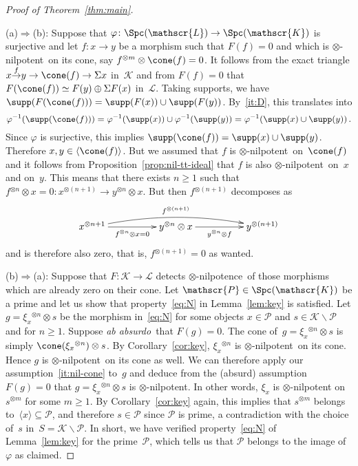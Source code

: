 \documentclass{amsart}
\numberwithin{equation}{section}
\theoremstyle{remark}
\begin{document}
\begin{proof}[Proof of Theorem~\ref{thm:main}]
\

(a)${\Rightarrow}$(b): Suppose that $\varphi\colon{\Spc({\mathscr{L}})}\to {\Spc({\mathscr{K}})}$ is surjective and let $f\colon x\to y$ be a morphism such that $F(f)=0$ and which is {$\otimes$-nilpotent}\ on its cone, say $f{^{\otimes {m}}}\otimes\cone(f)=0$. It follows from the exact triangle $x{\overset{{f}}\to} y\to \cone(f)\to \Sigma x$ in~${\mathscr{{K}}}$ and from $F(f)=0$ that $F(\cone(f))\simeq F(y)\oplus \Sigma F(x)$ in~${\mathscr{{L}}}$. Taking supports, we have $\supp(F(\cone(f)))=\supp(F(x))\cup \supp(F(y))$. By~\eqref{it:D}, this translates into
\[
\varphi{^{-1}}(\supp(\cone(f)))=\varphi{^{-1}}(\supp(x))\cup \varphi{^{-1}}(\supp(y))=\varphi{^{-1}}(\supp(x)\cup \supp(y))\,.
\]
Since $\varphi$ is surjective, this implies $\supp(\cone(f))=\supp(x)\cup \supp(y)$. Therefore $x,y\in{\langle {\cone(f)}\rangle}$. But we assumed that $f$ is {$\otimes$-nilpotent}\ on~$\cone(f)$ and it follows from Proposition~\ref{prop:nil-tt-ideal} that $f$ is also {$\otimes$-nilpotent}\ on~$x$ and on~$y$. This means that there exists $n\ge 1$ such that $f{^{\otimes {n}}}\otimes x=0\colon x{^{\otimes {(n+1)}}}\to y{^{\otimes {n}}}\otimes x$. But then $f{^{\otimes {(n+1)}}}$ decomposes as
\[
\xymatrix@C=5em{
x{^{\otimes {n+1}}} \ar[r]_-{f{^{\otimes {n}}}\otimes x=0} \ar@/^1em/[rr]^-{f{^{\otimes {(n+1)}}}}
& y{^{\otimes {n}}}\otimes x \ar[r]_-{y{^{\otimes {n}}}\otimes f}
& y{^{\otimes {(n+1)}}}
}
\]
and is therefore also zero, that is, $f{^{\otimes {(n+1)}}}=0$ as wanted.

(b)${\Rightarrow}$(a):
Suppose that $F\colon{\mathscr{{K}}}\to {\mathscr{{L}}}$ detects {$\otimes$-nilpotence}\ of those morphisms which are already zero on their cone. Let ${{\mathscr{{P}}}}\in{\Spc({\mathscr{K}})}$ be a prime and let us show that property~\eqref{eq:N} in Lemma~\ref{lem:key} is satisfied. Let $g=\xi_x{^{\otimes {n}}}\otimes s$ be the morphism in~\eqref{eq:N} for some objects $x\in{{\mathscr{{P}}}}$ and $s\in{\mathscr{{K}}}{\!\smallsetminus\!}{{\mathscr{{P}}}}$ and for $n\ge1$. Suppose {{\sl ab absurdo}}\ that $F(g)=0$. The cone of~$g=\xi_x{^{\otimes {n}}}\otimes s$ is simply $\cone(\xi_x{^{\otimes {n}}})\otimes s$. By Corollary~\ref{cor:key}, $\xi_x{^{\otimes {n}}}$ is {$\otimes$-nilpotent}\ on its cone. Hence $g$ is {$\otimes$-nilpotent}\ on its cone as well. We can therefore apply our assumption~\eqref{it:nil-cone} to~$g$ and deduce from the (absurd) assumption $F(g)=0$ that $g=\xi_x{^{\otimes {n}}}\otimes s$ is {$\otimes$-nilpotent}. In other words, $\xi_x$ is $\otimes$-nilpotent on~$s{^{\otimes {m}}}$ for some $m\ge1$. By Corollary~\ref{cor:key} again, this implies that $s{^{\otimes {m}}}$ belongs to~${\langle {x}\rangle} \subseteq{{\mathscr{{P}}}}$, and therefore $s\in{{\mathscr{{P}}}}$ since ${{\mathscr{{P}}}}$ is prime, a contradiction with the choice of~$s$ in~$S={\mathscr{{K}}}{\!\smallsetminus\!}{{\mathscr{{P}}}}$. In short, we have verified property~\eqref{eq:N} of Lemma~\ref{lem:key} for the prime~${{\mathscr{{P}}}}$, which tells us that ${{\mathscr{{P}}}}$ belongs to the image of~$\varphi$ as claimed.
\end{proof}
\end{document}
